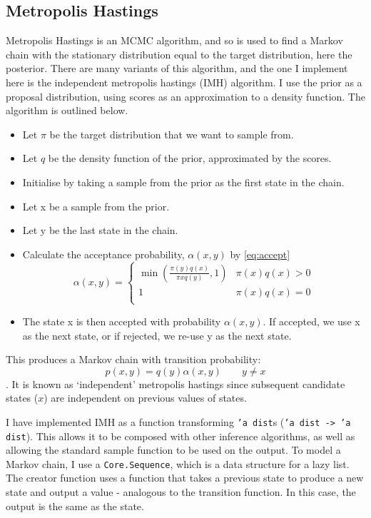 \subsection{Metropolis Hastings} \label{sec:mh}
Metropolis Hastings is an MCMC algorithm, and so is used to find a Markov chain with the stationary distribution equal to the target distribution, here the posterior. There are many variants of this algorithm, and the one I implement here is the independent metropolis hastings (IMH) algorithm. I use the prior as a proposal distribution, using scores as an approximation to a density function. The algorithm is outlined below.
\begin{itemize}
	\item Let $\pi$ be the target distribution that we want to sample from.
	\item Let $q$ be the density function of the prior, approximated by the scores.
	\item Initialise by taking a sample from the prior as the first state in the chain.
	\item Let x be a sample from the prior.
	\item Let y be the last state in the chain.
	\item Calculate the acceptance probability, $\alpha(x,y)$ by \eqref{eq:accept}
	      \begin{equation}
	      	\label{eq:accept}
	      	\alpha(x,y) = 
	      	\begin{cases}	
	      		\min{\left( \frac{\pi(y)q(x)}{\pi{x}q(y)},1 \right) } & \pi(x)q(x) > 0 \\
	      		1                                                     & \pi(x)q(x) = 0 \\
	      	\end{cases}
	      \end{equation}	      	      	      	      
	\item The state x is then accepted with probability $\alpha(x,y)$. If accepted, we use x as the next state, or if rejected, we re-use y as the next state. 
\end{itemize}
	
This produces a Markov chain with transition probability: \[p(x, y) = q(y)\alpha(x, y) \quad\quad y\neq x\].
It is known as `independent' metropolis hastings since subsequent candidate states ($x$) are independent on previous values of states.
	
I have implemented IMH as a function transforming \texttt{'a dist}s (\texttt{'a dist -> 'a dist}). This allows it to be composed with other inference algorithms, as well as allowing the standard sample function to be used on the output. To model a Markov chain, I use a \texttt{Core.Sequence}, which is a data structure for a lazy list. The creator function uses a function that takes a previous state to produce a new state and output a value - analogous to the transition function. In this case, the output is the same as the state.
	
